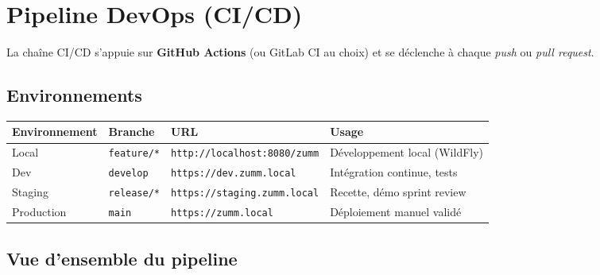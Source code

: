 \chapter{Pipeline DevOps (CI/CD)}
\label{chap:devops}

La chaîne CI/CD s'appuie sur \textbf{GitHub Actions} (ou GitLab CI au choix)
et se déclenche à chaque \emph{push} ou \emph{pull request}.

\section{Environnements}

\begin{center}
\begin{tabular}{llll}
\toprule
\textbf{Environnement} & \textbf{Branche} & \textbf{URL} & \textbf{Usage} \\
\midrule
Local      & \texttt{feature/*}  & \texttt{http://localhost:8080/zumm} & Développement local (WildFly) \\
Dev        & \texttt{develop}    & \texttt{https://dev.zumm.local}     & Intégration continue, tests \\
Staging    & \texttt{release/*}  & \texttt{https://staging.zumm.local} & Recette, démo sprint review \\
Production & \texttt{main}       & \texttt{https://zumm.local}         & Déploiement manuel validé \\
\bottomrule
\end{tabular}
\end{center}

\section{Vue d'ensemble du pipeline}

